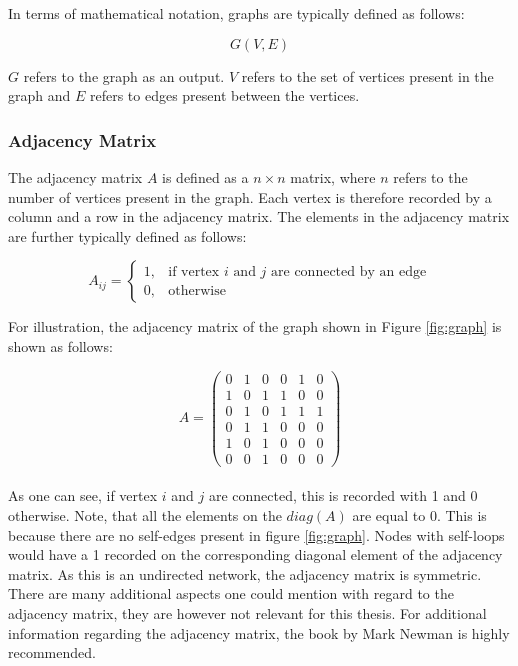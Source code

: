 	\noindent In terms of mathematical notation, graphs are typically defined
	as follows:

	\begin{equation}
		G(V,E)
	\end{equation}

	\noindent $G$ refers to the graph as an output. $V$ refers to the set of 
	vertices present in the graph and $E$ refers to edges present between the 
	vertices. \\

	\subsubsection{Adjacency Matrix}

	The adjacency matrix $A$ is defined as a $n \times n$ matrix, where $n$ refers
	to the number of vertices present in the graph. Each vertex is therefore
	recorded by a column and a row in the adjacency matrix. The elements in the
	adjacency matrix are further typically defined as follows:

	\begin{equation}
		A_{ij} = 
			\begin{cases}
				1, & \text{if vertex $i$ and $j$ are connected by an edge} \\
				0, & \text{otherwise}
			\end{cases}
	\end{equation}
	
	\noindent For illustration, the adjacency matrix of the graph shown in Figure
	\ref{fig:graph} is shown as follows:

	\[ A = 
	\begin{pmatrix}
		0 & 1 & 0 & 0 & 1 & 0 \\
		1 & 0 & 1 & 1 & 0 & 0 \\
		0 & 1 & 0 & 1 & 1 & 1 \\
		0 & 1 & 1 & 0 & 0 & 0 \\
		1 & 0 & 1 & 0 & 0 & 0 \\
		0 & 0 & 1 & 0 & 0 & 0  
	\end{pmatrix}
	\] \\
	
	\noindent As one can see, if vertex $i$ and $j$ are connected, this is recorded with
	1 and 0 otherwise. Note, that all the elements on the $diag(A)$ are equal
	to 0. This is because there are no self-edges present in figure
	\ref{fig:graph}. Nodes with self-loops would have a 1 recorded on the
	corresponding diagonal element of the adjacency matrix. As this is an 
	undirected network, the adjacency matrix is symmetric. There are many 
	additional aspects one could mention with regard to the adjacency matrix, 
	they are however not relevant for this thesis. For additional information 
	regarding the adjacency matrix, the book by Mark Newman 
	\citeyearpar{Newman2010} is highly recommended. 


